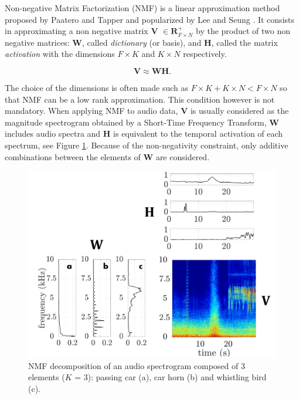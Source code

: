 \documentclass[review,5p,twocolumn,sort&compress,times]{elsarticle}
\begin{document}
Non-negative Matrix Factorization (NMF) is a linear approximation method proposed by Paatero and Tapper \cite{paatero1994positive} and popularized by Lee and Seung \cite{lee_learning_1999}. It consists in approximating a non negative matrix $\mathbf{V}$ $\in \mathbf{R}^+_{F \times N}$ by the product of two non negative matrices: $\mathbf{W}$, called \textit{dictionary} (or basis), and $\mathbf{H}$, called the matrix \textit{activation} with the dimensions $F \times K$ and $K \times N$ respectively.

\begin{equation}\label{eq:nmf}
\mathbf{V} \approx \mathbf{WH}.
\end{equation}

The choice of the dimensions is often made such as $F\times K + K \times N < F \times N$ so that NMF can be a low rank approximation. This condition however is not mandatory. When  applying NMF to audio data, $\mathbf{V}$ is usually considered as the magnitude spectrogram obtained by a Short-Time Frequency Transform, $\mathbf{W}$ includes audio spectra and $\mathbf{H}$ is equivalent to the temporal activation of each spectrum, see Figure \ref{fig:exampleNMF}. Because of the non-negativity constraint, only additive combinations between the elements of $\mathbf{W}$ are considered. %

\begin{figure}[t]
\includegraphics[width=.9\linewidth]{./figures/schema_introduction_nmf.pdf}
\caption{NMF decomposition of an audio spectrogram composed of 3 elements ($K$ = 3): passing car (a), car horn (b) and whistling bird (c).}
\label{fig:exampleNMF}
\end{figure}
\end{document}
